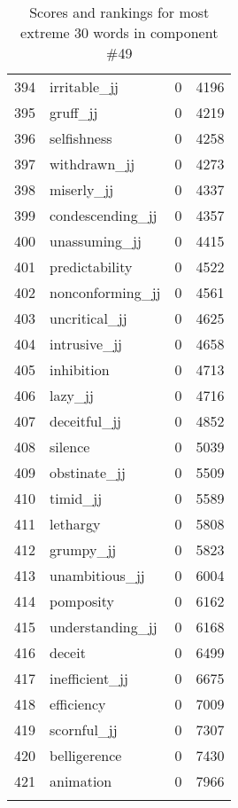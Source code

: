 \begin{longtable}[!htbp]{| rlr@{.}l |}
    394 & irritable\_jj & 0 & 4196 \\
    395 & gruff\_jj & 0 & 4219 \\
    396 & selfishness & 0 & 4258 \\
    397 & withdrawn\_jj & 0 & 4273 \\
    398 & miserly\_jj & 0 & 4337 \\
    399 & condescending\_jj & 0 & 4357 \\
    400 & unassuming\_jj & 0 & 4415 \\
    401 & predictability & 0 & 4522 \\
    402 & nonconforming\_jj & 0 & 4561 \\
    403 & uncritical\_jj & 0 & 4625 \\
    404 & intrusive\_jj & 0 & 4658 \\
    405 & inhibition & 0 & 4713 \\
    406 & lazy\_jj & 0 & 4716 \\
    407 & deceitful\_jj & 0 & 4852 \\
    408 & silence & 0 & 5039 \\
    409 & obstinate\_jj & 0 & 5509 \\
    410 & timid\_jj & 0 & 5589 \\
    411 & lethargy & 0 & 5808 \\
    412 & grumpy\_jj & 0 & 5823 \\
    413 & unambitious\_jj & 0 & 6004 \\
    414 & pomposity & 0 & 6162 \\
    415 & understanding\_jj & 0 & 6168 \\
    416 & deceit & 0 & 6499 \\
    417 & inefficient\_jj & 0 & 6675 \\
    418 & efficiency & 0 & 7009 \\
    419 & scornful\_jj & 0 & 7307 \\
    420 & belligerence & 0 & 7430 \\
    421 & animation & 0 & 7966 \\
    \hline
    \caption{Scores and rankings for most extreme 30 words in component \#49} \\
\end{longtable}
